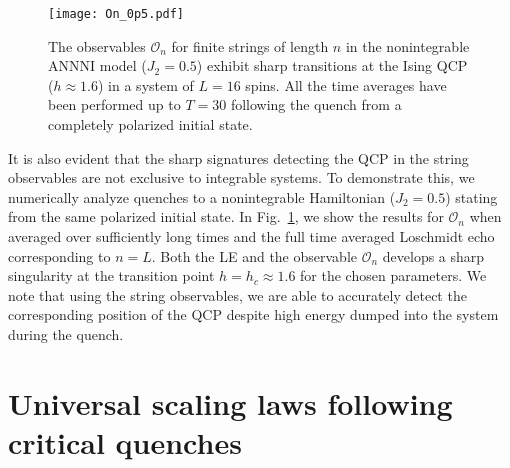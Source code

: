 \documentclass[aps,prx,twocolumn]{revtex4-2}
\begin{document}
\vspace{1cm}
\begin{figure}[ht]
	
		\texttt{[image: On\_0p5.pdf]}
		\label{fig:4a}
	
	\caption{ {The observables $\mathcal{O}_n$ for finite strings of length $n$ in the nonintegrable ANNNI model ($J_2=0.5$) exhibit sharp transitions at the Ising QCP ($h\approx1.6$) in a system of $L=16$ spins. All the time averages have been performed up to $T=30$ following the quench  {from} a completely polarized initial state. }}
	\label{fig:4}
\end{figure}

It is also evident that the sharp signatures detecting the QCP in the string observables are not exclusive to integrable systems.  {To demonstrate this,   {we numerically analyze quenches to a nonintegrable Hamiltonian ($J_2=0.5$) stating from the same polarized initial state}.  In Fig.~\ref{fig:4}, we show the results for $\mathcal{O}_n$  {when averaged over sufficiently long times} and the full time averaged Loschmidt echo corresponding to $n=L$.  Both the LE and the observable $\mathcal O_n$ develops a sharp singularity at the transition point $h=h_c\approx 1.6$ for the chosen parameters.}  We note that using the string observables, we are able to accurately detect the corresponding position of the QCP   {despite high energy dumped into the system during the quench.} \\


\section{Universal scaling laws following critical quenches}
\label{sec: critical_scaling}
\end{document}
